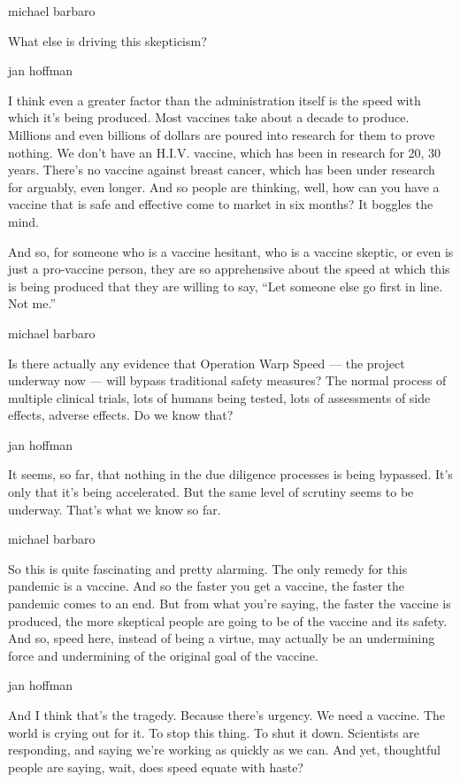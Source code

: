 michael barbaro

What else is driving this skepticism?

jan hoffman

I think even a greater factor than the administration itself is the
speed with which it's being produced. Most vaccines take about a decade
to produce. Millions and even billions of dollars are poured into
research for them to prove nothing. We don't have an H.I.V. vaccine,
which has been in research for 20, 30 years. There's no vaccine against
breast cancer, which has been under research for arguably, even longer.
And so people are thinking, well, how can you have a vaccine that is
safe and effective come to market in six months? It boggles the mind.

And so, for someone who is a vaccine hesitant, who is a vaccine skeptic,
or even is just a pro-vaccine person, they are so apprehensive about the
speed at which this is being produced that they are willing to say,
``Let someone else go first in line. Not me.''

michael barbaro

Is there actually any evidence that Operation Warp Speed --- the project
underway now --- will bypass traditional safety measures? The normal
process of multiple clinical trials, lots of humans being tested, lots
of assessments of side effects, adverse effects. Do we know that?

jan hoffman

It seems, so far, that nothing in the due diligence processes is being
bypassed. It's only that it's being accelerated. But the same level of
scrutiny seems to be underway. That's what we know so far.

michael barbaro

So this is quite fascinating and pretty alarming. The only remedy for
this pandemic is a vaccine. And so the faster you get a vaccine, the
faster the pandemic comes to an end. But from what you're saying, the
faster the vaccine is produced, the more skeptical people are going to
be of the vaccine and its safety. And so, speed here, instead of being a
virtue, may actually be an undermining force and undermining of the
original goal of the vaccine.

jan hoffman

And I think that's the tragedy. Because there's urgency. We need a
vaccine. The world is crying out for it. To stop this thing. To shut it
down. Scientists are responding, and saying we're working as quickly as
we can. And yet, thoughtful people are saying, wait, does speed equate
with haste?

